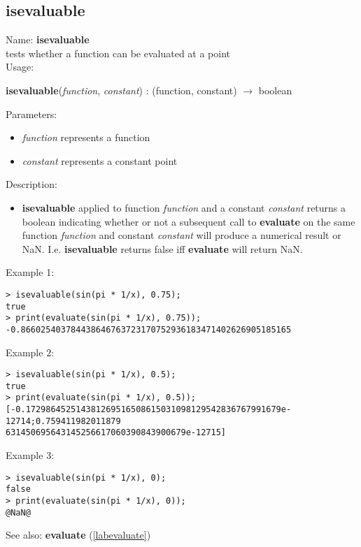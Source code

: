 \subsection{isevaluable}
\label{labisevaluable}
\noindent Name: \textbf{isevaluable}\\
tests whether a function can be evaluated at a point \\

\noindent Usage: 
\begin{center}
\textbf{isevaluable}(\emph{function}, \emph{constant}) : (\textsf{function}, \textsf{constant}) $\rightarrow$ \textsf{boolean}\\
\end{center}
Parameters: 
\begin{itemize}
\item \emph{function} represents a function
\item \emph{constant} represents a constant point
\end{itemize}
\noindent Description: \begin{itemize}

\item \textbf{isevaluable} applied to function \emph{function} and a constant \emph{constant} returns
   a boolean indicating whether or not a subsequent call to \textbf{evaluate} on the
   same function \emph{function} and constant \emph{constant} will produce a numerical
   result or NaN. I.e. \textbf{isevaluable} returns false iff \textbf{evaluate} will return NaN.
\end{itemize}
\noindent Example 1: 
\begin{center}\begin{minipage}{15cm}\begin{Verbatim}[frame=single]
> isevaluable(sin(pi * 1/x), 0.75);
true
> print(evaluate(sin(pi * 1/x), 0.75));
-0.866025403784438646763723170752936183471402626905185165
\end{Verbatim}
\end{minipage}\end{center}
\noindent Example 2: 
\begin{center}\begin{minipage}{15cm}\begin{Verbatim}[frame=single]
> isevaluable(sin(pi * 1/x), 0.5);
true
> print(evaluate(sin(pi * 1/x), 0.5));
[-0.172986452514381269516508615031098129542836767991679e-12714;0.759411982011879
631450695643145256617060390843900679e-12715]
\end{Verbatim}
\end{minipage}\end{center}
\noindent Example 3: 
\begin{center}\begin{minipage}{15cm}\begin{Verbatim}[frame=single]
> isevaluable(sin(pi * 1/x), 0);
false
> print(evaluate(sin(pi * 1/x), 0));
@NaN@
\end{Verbatim}
\end{minipage}\end{center}
See also: \textbf{evaluate} (\ref{labevaluate})
